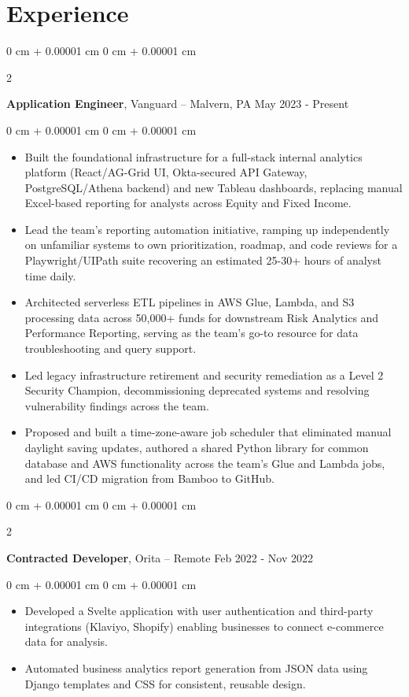 \documentclass[12pt, letterpaper]{article}
\newenvironment{highlights}{
    \begin{itemize}[
        topsep=0.02 cm,
        parsep=0.05 cm,
        partopsep=0pt,
        itemsep=0pt,
        leftmargin=0 cm + 10pt
    ]
}{
    \end{itemize}
} %
\newenvironment{onecolentry}{
    \begin{adjustwidth}{
        0 cm + 0.00001 cm
    }{
        0 cm + 0.00001 cm
    }
}{
    \end{adjustwidth}
} %
\newenvironment{twocolentry}[2][]{
    \onecolentry
    \def\secondColumn{#2}
    \setcolumnwidth{\fill, 4.5 cm}
    \begin{paracol}{2}
}{
    \switchcolumn \raggedleft \secondColumn
    \end{paracol}
    \endonecolentry
} %
\begin{document}
    \section{Experience}
    \vspace{0.15cm}
    \begin{twocolentry}{
        May 2023 - Present
    }
    \textbf{Application Engineer}, Vanguard -- Malvern, PA \end{twocolentry}
    \vspace{0.05 cm}
    \begin{onecolentry}
      \begin{highlights}
        \item Built the foundational infrastructure for a full-stack internal analytics platform (React/AG-Grid UI, Okta-secured API Gateway, PostgreSQL/Athena backend) and new Tableau dashboards, replacing manual Excel-based reporting for analysts across Equity and Fixed Income.
        \item Lead the team's reporting automation initiative, ramping up independently on unfamiliar systems to own prioritization, roadmap, and code reviews for a Playwright/UIPath suite recovering an estimated 25-30+ hours of analyst time daily.
        \item Architected serverless ETL pipelines in AWS Glue, Lambda, and S3 processing data across 50,000+ funds for downstream Risk Analytics and Performance Reporting, serving as the team's go-to resource for data troubleshooting and query support.
        \item Led legacy infrastructure retirement and security remediation as a Level 2 Security Champion, decommissioning deprecated systems and resolving vulnerability findings across the team.
        \item Proposed and built a time-zone-aware job scheduler that eliminated manual daylight saving updates, authored a shared Python library for common database and AWS functionality across the team's Glue and Lambda jobs, and led CI/CD migration from Bamboo to GitHub.
      \end{highlights}
    \end{onecolentry}
    \vspace{0.05 cm}
    \begin{twocolentry}{
        Feb 2022 - Nov 2022
    }
    \textbf{Contracted Developer}, Orita -- Remote \end{twocolentry}
    \vspace{0.05 cm}
    \begin{onecolentry}
      \begin{highlights}
        \item Developed a Svelte application with user authentication and third-party integrations (Klaviyo, Shopify) enabling businesses to connect e-commerce data for analysis.
        \item Automated business analytics report generation from JSON data using Django templates and CSS for consistent, reusable design.
      \end{highlights}
    \end{onecolentry}
\end{document}
